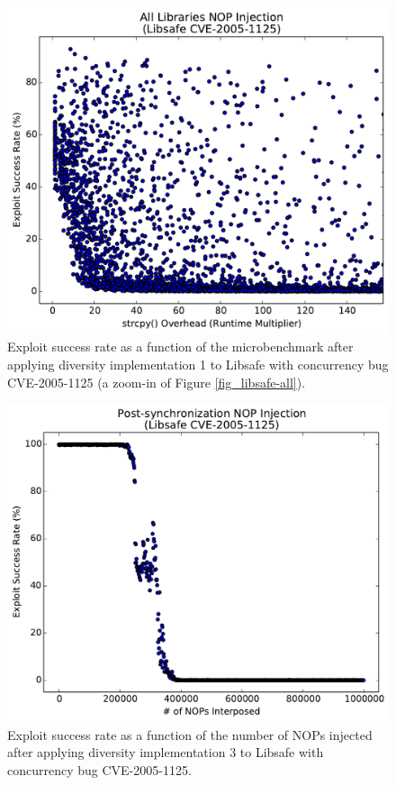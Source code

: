 \begin{figure}
	\centering
	\includegraphics[width=\columnwidth]{figures/libsafe-all-zoom}
	\caption{Exploit success rate as a function of the microbenchmark after applying diversity implementation 1 to Libsafe with concurrency bug CVE-2005-1125 (a zoom-in of Figure \ref{fig_libsafe-all}).}
	\label{fig_libsafe-all-zoom}
\end{figure}

\begin{figure}
	\centering
	\includegraphics[width=\columnwidth]{figures/libsafe-post}
	\caption{Exploit success rate as a function of the number of NOPs injected after applying diversity implementation 3 to Libsafe with concurrency bug CVE-2005-1125.}
	\label{fig_libsafe-post}
\end{figure}

